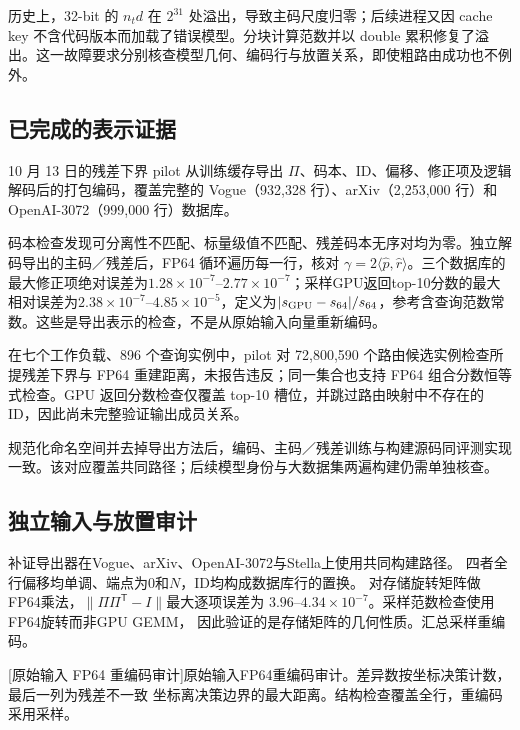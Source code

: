 历史上，32-bit 的 $n_t d$ 在 $2^{31}$ 处溢出，导致主码尺度归零；后续进程又因 cache key 不含代码版本而加载了错误模型。分块计算范数并以 double 累积修复了溢出。这一故障要求分别核查模型几何、编码行与放置关系，即使粗路由成功也不例外。

\subsection{已完成的表示证据}

10 月 13 日的残差下界 pilot 从训练缓存导出 $\Pi$、码本、ID、偏移、修正项及逻辑解码后的打包编码，覆盖完整的 Vogue（932,328 行）、arXiv（2,253,000 行）和 OpenAI-3072（999,000 行）数据库。

码本检查发现可分离性不匹配、标量级值不匹配、残差码本无序对均为零。独立解码导出的主码／残差后，FP64 循环遍历每一行，核对 $\gamma=2\langle\widehat p,\widehat r\rangle$。三个数据库的最大修正项绝对误差为$1.28\times10^{-7}$--$2.77\times10^{-7}$；采样GPU返回top-10分数的最大相对误差为$2.38\times10^{-7}$--$4.85\times10^{-5}$，定义为$|s_{\rm GPU}-s_{64}|/s_{64}$，参考含查询范数常数。这些是导出表示的检查，不是从原始输入向量重新编码。


在七个工作负载、896 个查询实例中，pilot 对 72,800,590 个路由候选实例检查所提残差下界与 FP64 重建距离，未报告违反；同一集合也支持 FP64 组合分数恒等式检查。GPU 返回分数检查仅覆盖 top-10 槽位，并跳过路由映射中不存在的 ID，因此尚未完整验证输出成员关系。

规范化命名空间并去掉导出方法后，编码、主码／残差训练与构建源码同评测实现一致。该对应覆盖共同路径；后续模型身份与大数据集两遍构建仍需单独核查。

\subsection{独立输入与放置审计}
\label{sec:4-representation-audit}

补证导出器在Vogue、arXiv、OpenAI-3072与Stella上使用共同构建路径。
四者全行偏移均单调、端点为0和$N$，ID均构成数据库行的置换。
对存储旋转矩阵做FP64乘法，$\|\Pi\Pi^{\mathsf T}-I\|$最大逐项误差为
$3.96$--$4.34\times10^{-7}$。采样范数检查使用FP64旋转而非GPU GEMM，
因此验证的是存储矩阵的几何性质。汇总采样重编码。

\par\medskip\noindent\begin{minipage}{\linewidth}
\centering\captionsetup{hypcap=false}
[原始输入 FP64 重编码审计]{原始输入FP64重编码审计。差异数按坐标决策计数，最后一列为残差不一致
坐标离决策边界的最大距离。结构检查覆盖全行，重编码采用采样。}
\label{tab:4-representation-audit}
\scriptsize\setlength{\tabcolsep}{3pt}

\end{minipage}\par\medskip

